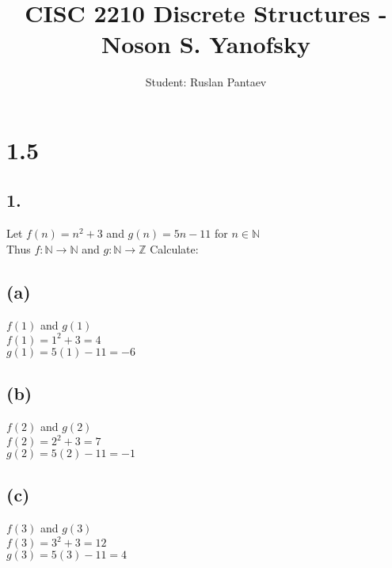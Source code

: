 \documentclass[11pt]{article}
\begin{document}
\title{CISC 2210 Discrete Structures - Noson S. Yanofsky}
\author{Student: Ruslan Pantaev}
\maketitle


\section*{1.5}
%
%
\subsection*{1.}
\begin{center}
Let $f(n) = n^{2} + 3$ and $g(n) = 5n - 11$ for $n \in \mathbb{N}$\\
Thus $f: \mathbb{N} \rightarrow \mathbb{N}$ and $g: \mathbb{N} \rightarrow \mathbb{Z}$ Calculate:
\end{center}

\subsection*{(a)}
\begin{center}
$f(1)$ and $g(1)$\\
$f(1) = 1^{2} + 3 = 4$\\
$g(1) = 5(1) - 11 = -6$\\
\end{center}

\subsection*{(b)}
\begin{center}
$f(2)$ and $g(2)$\\
$f(2) = 2^{2} + 3 = 7$\\
$g(2) = 5(2) - 11 = -1$\\
\end{center}

\subsection*{(c)}
\begin{center}
$f(3)$ and $g(3)$\\
$f(3) = 3^{2} + 3 = 12$\\
$g(3) = 5(3) - 11 = 4$\\
\end{center}
\end{document}
